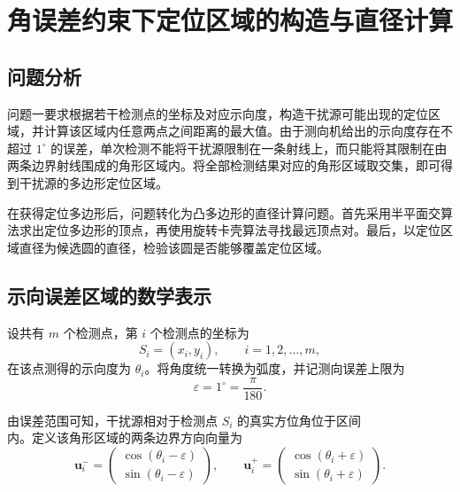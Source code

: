 \section{角误差约束下定位区域的构造与直径计算}

\subsection{问题分析}

问题一要求根据若干检测点的坐标及对应示向度，构造干扰源可能出现的定位区域，并计算该区域内任意两点之间距离的最大值。由于测向机给出的示向度存在不超过 $1^\circ$ 的误差，单次检测不能将干扰源限制在一条射线上，而只能将其限制在由两条边界射线围成的角形区域内。将全部检测结果对应的角形区域取交集，即可得到干扰源的多边形定位区域。

在获得定位多边形后，问题转化为凸多边形的直径计算问题。首先采用半平面交算法求出定位多边形的顶点，再使用旋转卡壳算法寻找最远顶点对。最后，以定位区域直径为候选圆的直径，检验该圆是否能够覆盖定位区域。

\subsection{示向误差区域的数学表示}

设共有 $m$ 个检测点，第 $i$ 个检测点的坐标为
\begin{equation}
  S_i=(x_i,y_i),\qquad i=1,2,\ldots,m,
  \label{eq:q1-detection-point}
\end{equation}
在该点测得的示向度为 $\theta_i$。将角度统一转换为弧度，并记测向误差上限为
\begin{equation}
  \varepsilon=1^\circ=\frac{\pi}{180}.
  \label{eq:q1-angle-error}
\end{equation}

由误差范围可知，干扰源相对于检测点 $S_i$ 的真实方位角位于区间
\begin{equation}
  [\theta_i-\varepsilon,\,\theta_i+\varepsilon]
  \label{eq:q1-angle-interval}
\end{equation}
内。定义该角形区域的两条边界方向向量为
\begin{equation}
  \mathbf{u}_i^-=
  \begin{pmatrix}
    \cos(\theta_i-\varepsilon)\\
    \sin(\theta_i-\varepsilon)
  \end{pmatrix},
  \qquad
  \mathbf{u}_i^+=
  \begin{pmatrix}
    \cos(\theta_i+\varepsilon)\\
    \sin(\theta_i+\varepsilon)
  \end{pmatrix}.
  \label{eq:q1-boundary-vectors}
\end{equation}

